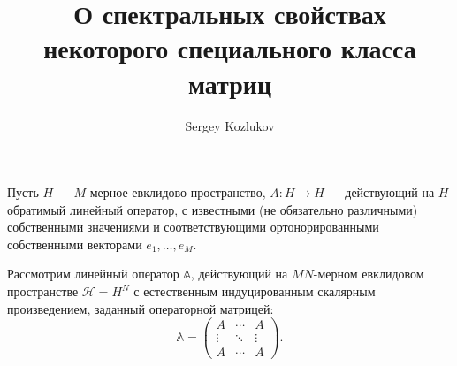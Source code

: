 \documentclass{article}
\title{О спектральных свойствах некоторого специального класса матриц}
\author{Sergey Kozlukov}
\begin{document}
\maketitle

Пусть \( H \) --- \( M \)-мерное евклидово пространство,
\( A: H\to H \) --- действующий на \( H \) обратимый линейный оператор,
с известными (не обязательно различными) собственными значениями
и соответствующими ортонорированными собственными векторами \( e_1, \ldots, e_M \).

Рассмотрим линейный оператор \( \mathbb{A} \),
действующий на \( MN \)-мерном евклидовом пространстве \( \mathcal{H} = H^N \)
с естественным индуцированным скалярным произведением,
заданный операторной матрицей:
\[
    \mathbb{A} = \begin{pmatrix}
        A & \cdots & A \\
        \vdots & \ddots & \vdots \\
        A & \cdots & A
    \end{pmatrix}.
    \]
\end{document}
